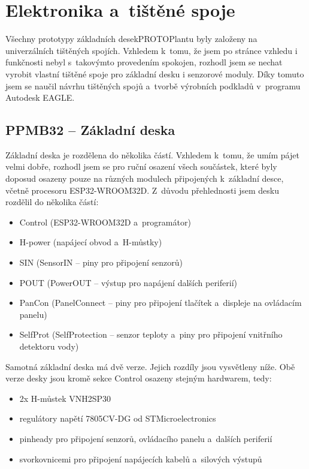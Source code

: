 \chapter{Elektronika a~tištěné spoje}
Všechny prototypy základních desekPROTOPlantu byly založeny na univerzálních tištěných spojích. Vzhledem k~tomu, že jsem po stránce vzhledu i funkčnosti nebyl s~takovýmto provedením spokojen, rozhodl jsem se nechat vyrobit vlastní tištěné spoje pro základní desku i senzorové moduly.
Díky tomuto jsem se naučil návrhu tištěných spojů a~tvorbě výrobních podkladů v~programu Autodesk EAGLE.

\section{PPMB32 -- Základní deska}
\label{subsec:motherBoard}
Základní deska je rozdělena do několika částí. 
Vzhledem k~tomu, že umím pájet velmi dobře, rozhodl jsem se pro ruční osazení všech součástek, které byly doposud osazeny pouze na různých modulech připojených k~základní desce, včetně procesoru ESP32-WROOM32D.
Z~důvodu přehlednosti jsem desku rozdělil do několika částí:

\begin{itemize}
    \item Control (ESP32-WROOM32D a~programátor)
    \item H-power (napájecí obvod a~H-můstky)
    \item SIN (SensorIN -- piny pro připojení senzorů)
    \item POUT (PowerOUT -- výstup pro napájení dalších periferií)
    \item PanCon (PanelConnect -- piny pro připojení tlačítek a~displeje na ovládacím panelu)
    \item SelfProt (SelfProtection -- senzor teploty a~piny pro připojení vnitřního detektoru vody)
\end{itemize} 

Samotná základní deska má dvě verze. Jejich rozdíly jsou vysvětleny níže.
Obě verze desky jsou kromě sekce Control osazeny stejným hardwarem, tedy:

\begin{itemize}
    \item 2x H-můstek VNH2SP30
    \item regulátory napětí 7805CV-DG od STMicroelectronics
    \item pinheady pro připojení senzorů, ovládacího panelu a~dalších periferií
    \item svorkovnicemi pro připojení napájecích kabelů a~silových výstupů
\end{itemize}

